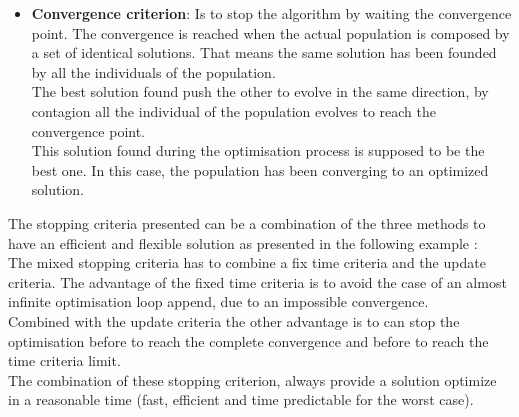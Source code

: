 \begin{itemize}
\item \textbf{Convergence criterion}: Is to stop the algorithm by waiting the convergence point. The convergence is reached when the actual population is composed by a set of identical solutions. That means the same solution has been founded by all the individuals of the population. \\
 The best solution found push the other to evolve in the same direction, by contagion all the individual of the population evolves to reach the convergence point. \\ 
 This solution found during the optimisation process is supposed to be the best one. In this case, the population has been converging to an optimized solution.%
\end{itemize}

 The stopping criteria presented can be a combination of the three methods to have an efficient and flexible solution as presented in the following example :\\
The mixed stopping criteria has to combine a fix time criteria and the update criteria.
The advantage of the fixed time criteria is to avoid the case of an almost infinite optimisation loop append, due to an impossible convergence.%
\\ %
Combined with the update criteria the other advantage is to can stop the optimisation before to reach the complete convergence and before to reach the time criteria limit.\\
The combination of these stopping criterion, always provide a solution optimize in a reasonable time (fast, efficient and time predictable for the worst case). 

 
%



